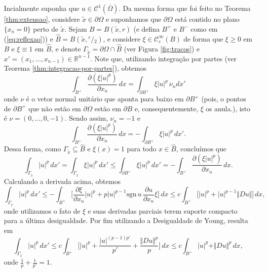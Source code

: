\documentclass[a4paper, 11pt]{book}
\theoremstyle{definition}
\newcommand{\bR}{\mathbb{R}}
\newcommand{\cC}{\mathcal{C}}
\newcommand{\sgn}{\mathrm{sgn}}
\newcommand{\sfrac}[2]{{}^{#1}\!\!/\!_{#2}}
\begin{document}
\begin{prf}
    Incialmente suponha que $u \in \cC^1(\overline{\Omega})$. Da mesma forma que foi feito no Teorema \ref{thm:extensao}, considere $\tilde x \in \partial\Omega$ e suponhamos que $\partial\Omega$ está contido no plano $\{x_n = 0\}$ perto de $\tilde x$.
    Sejam $B = B(\tilde x, r)$ (e defina $B^+$ e $B^-$ como em (\ref{eq:reflexao})) e $\widehat B = B(\tilde x, \sfrac{r}{2})$,
    e considere $\xi \in \cC^{\infty}_c(B)$ de forma que $\xi \geqslant 0$ em $B$ e $\xi \equiv 1$ em $\widehat B$, e denote $\Gamma_{\tilde x} = \partial \Omega \cap \widehat B$ (ver Figura \ref{fig:tracos}) e $x' = (x_1,\dots,x_{n-1}) \in \bR^{n-1}$.
    Note que, utilizando integração por partes (ver Teorema \ref{thm:integracao-por-partes}), obtemos
    \[
        \int_{B^+} \dfrac{\partial (\xi |u|^p)}{\partial x_n}\,dx = \int_{\partial B^+} \xi |u|^p \, \nu_n dx'
    \]
    onde $\nu$ é o vetor normal unitário que aponta para baixo em $\partial B^+$ (pois, o pontos de $\partial B^+$ que não estão em $\partial \Omega$ estão em $\partial B$ e, consequentemente, $\xi$ os anula.), isto é $\nu =  (0,\dots,0,-1)$. Sendo assim, $\nu_n = -1$ e 
    \[
        \int_{B^+} \dfrac{\partial (\xi |u|^p)}{\partial x_n} \,dx = -\int_{\partial B^+} \xi |u|^p \,dx'.
    \]
    Dessa forma, como $\Gamma_{\tilde x} \subseteq \hat B$ e $\xi(x) = 1$ para todo $x \in \hat B$, concluímos que
    \[
        \int_{\Gamma_{\tilde x}} |u|^p \,dx' = \int_{\Gamma_{\tilde x}} \xi|u|^p \,dx' \leqslant \int_{\partial B^+} \xi|u|^p \,dx' = -\int_{B^+} \dfrac{\partial (\xi |u|^p)}{\partial x_n} \,dx.
    \]
    Calculando a derivada acima, obtemos
    \[
        \int_{\Gamma_{\tilde x}} |u|^p \,dx' \leqslant - \int_{B^+} \Big[ \dfrac{\partial \xi}{\partial x_n} |u|^p + p|u|^{p-1} \sgn\,u\,\dfrac{\partial u}{\partial x_n} \xi \Big] \,dx \leqslant c \int_{B^+} \Big[ |u|^p + |u|^{p-1} \Vert Du \Vert \Big] \,dx,
    \]
    onde utilizamos o fato de $\xi$ e suas derivadas parciais terem suporte compacto para a última desigualdade. Por fim utilizando a Desigualdade de Young, resulta em
    \begin{equation} \label{eq:umaisdu}
        \int_{\Gamma_{\tilde x}} |u|^p \,dx' \leqslant c \int_{B^+} \bigg[ |u|^p + \frac{|u|^{(p-1)p'}}{p'} + \frac{\Vert Du \Vert^p}{p} \bigg] \,dx \leqslant c \int_{B^+} |u|^p + \Vert Du \Vert^p \,dx,
    \end{equation}
    onde $\frac{1}{p} + \frac{1}{p'} = 1$.

    \begin{figure}
        \centering
\end{figure}
\end{prf}
\end{document}
